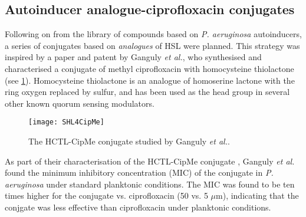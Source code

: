 











\subsection{Autoinducer analogue-ciprofloxacin conjugates\label{sec:AIA_intro}}

Following on from the library of compounds based on \textit{P. aeruginosa} autoinducers, a series of conjugates based on \textit{analogues} of HSL were planned. This strategy was inspired by a paper\cite{Ganguly2011} and patent\cite{Iyer2012} by Ganguly \textit{et al.}, who synthesised and characterised a conjugate  of methyl ciprofloxacin with homocysteine thiolactone (see \ref{fgr:SHL4CipMe}). Homocysteine thiolactone is an analogue of homoserine lactone with the ring oxygen replaced by sulfur, and has been used as the head group in several other known quorum sensing modulators\cite{Eberhard1986,Schaefer1996,Passador1996,Smith2003,Chhabra1993,McInnis2011,Geske2007,Janssens2007}.


\begin{figure}[H]
	\begin{center}
		\texttt{[image: SHL4CipMe]}
		\caption{The HCTL-CipMe conjugate  studied by Ganguly \textit{et al.}\cite{Ganguly2011,Iyer2012}.\label{fgr:SHL4CipMe}}
	\end{center}
\end{figure}


As part of their characterisation of the HCTL-CipMe conjugate , Ganguly \textit{et al.} found the minimum inhibitory concentration (MIC) of the conjugate in \textit{P. aeruginosa} under standard planktonic conditions. 
The MIC was found to be ten times higher for the conjugate vs. ciprofloxacin (50 vs. 5 $\mu$m), indicating that the conjgate was less effective than ciprofloxacin under planktonic conditions. 


